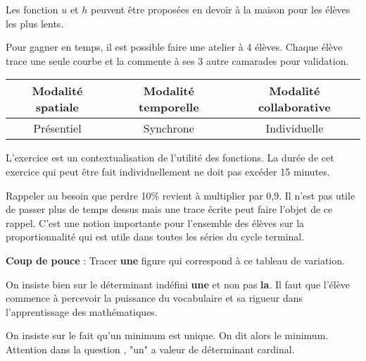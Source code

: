 Les fonction $u$ et $h$ peuvent être proposées en devoir à la maison pour les élèves les plus lents.

\begin{Ast}
Pour gagner en temps, il est possible faire une atelier à 4 élèves. Chaque élève trace une seule courbe et la commente à ses 3 autre camarades pour validation.
\end{Ast}


\begin{seanceprof}

\end{seanceprof}

\begin{tabular}{|c|c|c|}
\hline 
Modalité spatiale & Modalité temporelle & Modalité collaborative \\ 
\hline 
Présentiel & Synchrone & Individuelle \\ 
\hline 
\end{tabular} 




L'exercice est un contextualisation de l'utilité des fonctions. La durée de cet exercice qui peut être fait individuellement ne doit pas excéder 15 minutes.

\begin{Rq}
Rappeler au besoin que perdre 10\% revient à multiplier par 0,9. Il n'est pas utile de passer plus de temps dessus mais une trace écrite peut faire l'objet de ce rappel. C'est une notion importante pour l'ensemble des élèves sur la proportionnalité qui est utile dans toutes les séries du cycle terminal.
\end{Rq}


\textbf{Coup de pouce} : Tracer \textbf{une} figure qui correspond à ce tableau de variation.

\begin{Att}
On insiste bien sur le déterminant indéfini \textbf{une} et non pas \textbf{la}. Il faut que l'élève commence à percevoir la puissance du vocabulaire et sa rigueur dans l'apprentissage des mathématiques. 
\end{Att}

\begin{Att}
On insiste sur le fait qu'un minimum est unique. On dit alors le minimum. Attention dans la question , "un" a valeur de déterminant cardinal. 
\end{Att}

